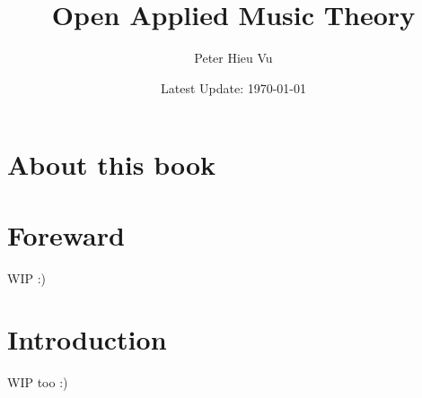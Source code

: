 \documentclass[12pt]{book}
\title{Open Applied Music Theory}
\author{Peter Hieu Vu}
\date{Latest Update: \today}
\begin{document}
    \maketitle

    \frontmatter
    \chapter{About this book}

    \tableofcontents

    \setcounter{page}{1}
    \chapter{Foreward}
    WIP :)

    \mainmatter
    \setcounter{page}{1}
    \chapter{Introduction}
    WIP too :)
    
\end{document}
